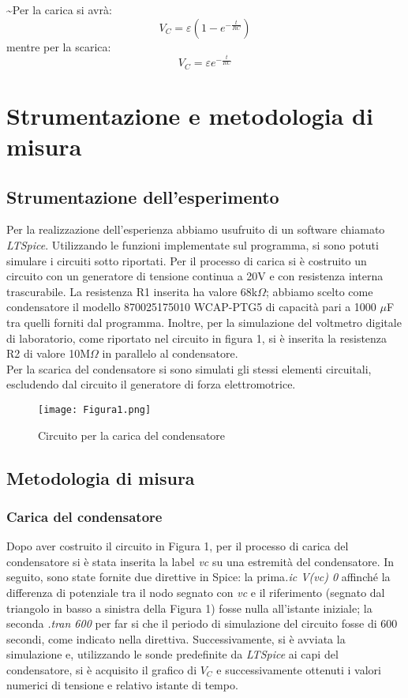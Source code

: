 \documentclass{article}
\begin{document}
\~

\noindent Per la carica si avrà:
\begin{equation}
    V_C = \varepsilon (1-e^{-\frac{t}{RC}})
\end{equation}
mentre per la scarica:
\begin{equation}
    V_C = \varepsilon e^{-\frac{t}{RC}}
\end{equation}

\section{Strumentazione e metodologia di misura}
\subsection{Strumentazione dell'esperimento}
Per la realizzazione dell'esperienza abbiamo usufruito di un software chiamato \emph{LTSpice}. Utilizzando le funzioni implementate sul programma, si sono potuti simulare i circuiti sotto riportati.
Per il processo di carica si è costruito un circuito con un generatore di tensione continua a 20V e con resistenza interna trascurabile. La resistenza R1 inserita ha valore 68k$\Omega$; abbiamo scelto come condensatore il modello 870025175010 WCAP-PTG5 di capacità pari a 1000 $\mu$F tra quelli forniti dal programma. Inoltre, per la simulazione del voltmetro digitale di laboratorio, come riportato nel circuito in figura 1, si è inserita la resistenza R2 di valore 10M$\Omega$ in parallelo al condensatore. \\
Per la scarica del condensatore si sono simulati gli stessi elementi circuitali, escludendo dal circuito il generatore di forza elettromotrice.
\begin{figure}
    \centering
    \texttt{[image: Figura1.png]}
    \caption{Circuito per la carica del condensatore}
    \label{figura1}
\end{figure}

\subsection{Metodologia di misura}
\subsubsection{Carica del condensatore}
Dopo aver costruito il circuito in Figura 1, per il processo di carica del condensatore si è stata inserita la label \emph{vc} su una estremità del condensatore. In seguito, sono state fornite due direttive in Spice: la prima\emph{.ic V(vc) 0} affinché la differenza di potenziale tra il nodo segnato con \emph{vc} e il riferimento (segnato dal triangolo in basso a sinistra della Figura 1) fosse nulla all’istante iniziale; la seconda \emph{.tran 600} per far si che il periodo di simulazione del circuito fosse di 600 secondi, come indicato nella direttiva. Successivamente, si è avviata la simulazione e, utilizzando le sonde predefinite da \emph{LTSpice} ai capi del condensatore, si è acquisito il grafico di $V_C$ e successivamente ottenuti i valori numerici di tensione e relativo istante di tempo.
\end{document}
